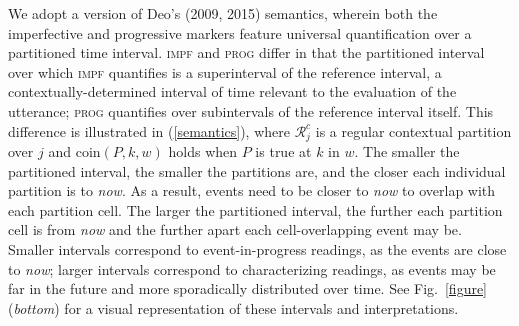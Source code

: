 \documentclass[12pt]{article}
\newcommand{\gcs}[1]{\textcolor{blue}{[gcs: #1]}}
\newcommand{\gnl}[1]{\textcolor{red}{[gnl: #1]}}
\begin{document}
We adopt a version of Deo's (2009, 2015) semantics, wherein both the imperfective and progressive markers feature universal quantification over a partitioned time interval. \textsc{impf} and \textsc{prog} differ in that the partitioned interval over which \textsc{impf} quantifies is a superinterval of the reference interval, a contextually-determined interval of time relevant to the evaluation of the utterance; \textsc{prog} quantifies over subintervals of the reference interval itself. This difference is illustrated in (\ref{semantics}), where $\mathscr{R}_j^c$ is a regular contextual partition over $j$ and {\sc coin}$(P,k,w)$ holds when $P$ is true at $k$ in $w$. The smaller the partitioned interval, the smaller the partitions are, and the closer each individual partition is to \textit{now}. As a result, events need to be closer to \textit{now} to overlap with each partition cell. The larger the partitioned interval, the further each partition cell is from \textit{now} and the further apart each cell-overlapping event may be. Smaller intervals correspond to event-in-progress readings, as the events are close to \textit{now}; larger intervals correspond to characterizing readings, as events may be far in the future and more sporadically distributed over time. See Fig.~\ref{figure} (\emph{bottom}) for a visual representation of these intervals and interpretations. %

\end{document}
